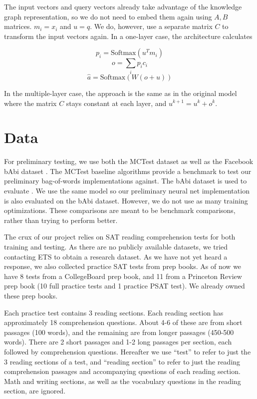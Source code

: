 \documentclass[pageno]{jpaper}
\begin{document}
The input vectors and query vectors already take advantage of the knowledge
graph representation, so we do not need to embed them again using $A,B$
matrices. ${m_i} = {x_i}$ and $u = q$. We do, however, use a separate matrix $C$
to transform the input vectors again. In a one-layer case, the architecture
calculates

$$p_i = \text{Softmax}\left(u^Tm_i\right)$$
$$o = \sum_i p_ic_i$$
$$\hat{a} = \text{Softmax}\left(W\left(o+u\right)\right)$$

In the multiple-layer case, the approach is the same as in the original model where
the matrix $C$ stays constant at each layer, and $u^{k+1} = u^k + o^k$.

\section{Data}
\label{Data}

For preliminary testing, we use both the MCTest \cite{Richardson2013} dataset as
well as the Facebook bAbi dataset \cite{Weston2015}. The MCTest baseline
algorithms provide a benchmark to test our preliminary bag-of-words
implementations against. The bAbi dataset is used to evaluate
\cite{Sukhbaatar2015}. We use the same model so our preliminary neural net
implementation is also evaluated on the bAbi dataset. However, we do not use as
many training optimizations. These comparisons are meant to be benchmark
comparisons, rather than trying to perform better.

The crux of our project relies on SAT reading comprehension tests for both
training and testing. As there are no publicly available datasets, we tried
contacting ETS to obtain a research dataset. As we have not yet heard a response,
we also collected practice SAT tests from prep books. As of now we have 8 tests
from a CollegeBoard prep book, and 11 from a Princeton Review prep book (10 full
practice tests and 1 practice PSAT test). We already owned these prep books.

Each practice test contains 3 reading sections. Each reading section has
approximately 18 comprehension questions. About 4-6 of these are from short
passages (100 words), and the remaining are from longer passages (450-500
words). There are 2 short passages and 1-2 long passages per section, each
followed by comprehension questions. Hereafter we use ``test'' to refer to just
the 3 reading sections of a test, and ``reading section'' to refer to just the
reading comprehension passages and accompanying questions of each reading
section. Math and writing sections, as well as the vocabulary questions in the
reading section, are ignored.
\end{document}
